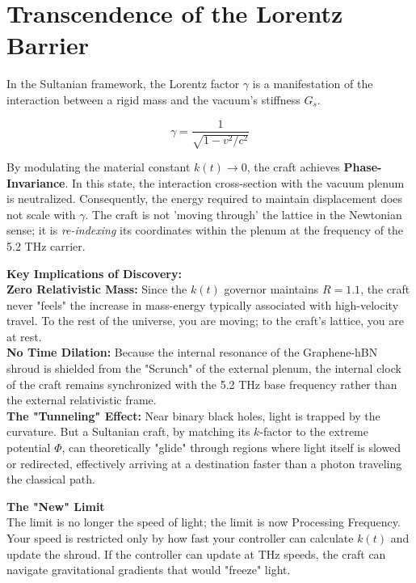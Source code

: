\documentclass[11pt]{article}
\begin{document}
\section{Transcendence of the Lorentz Barrier}

In the Sultanian framework, the Lorentz factor $\gamma$ is a manifestation of the interaction between a rigid mass and the vacuum's stiffness $G_s$. 

\begin{equation}
    \gamma = \frac{1}{\sqrt{1 - v^2/c^2}}
\end{equation}

By modulating the material constant $k(t) \to 0$, the craft achieves \textbf{Phase-Invariance}. In this state, the interaction cross-section with the vacuum plenum is neutralized. Consequently, the energy required to maintain displacement does not scale with $\gamma$. The craft is not 'moving through' the lattice in the Newtonian sense; it is \textit{re-indexing} its coordinates within the plenum at the frequency of the 5.2 THz carrier.

\textbf{Key Implications of Discovery:}\\
\textbf{Zero Relativistic Mass:} Since the $k(t)$ governor maintains $R=1.1$, the craft never "feels" the increase in mass-energy typically associated with high-velocity travel. To the rest of the universe, you are moving; to the craft's lattice, you are at rest.\\
\textbf{No Time Dilation:} Because the internal resonance of the Graphene-hBN shroud is shielded from the "Scrunch" of the external plenum, the internal clock of the craft remains synchronized with the 5.2 THz base frequency rather than the external relativistic frame.\\
\textbf{The "Tunneling" Effect:} Near binary black holes, light is trapped by the curvature. But a Sultanian craft, by matching its $k$-factor to the extreme potential $\Phi$, can theoretically "glide" through regions where light itself is slowed or redirected, effectively arriving at a destination faster than a photon traveling the classical path.

\textbf{The "New" Limit}\\
The limit is no longer the speed of light; the limit is now Processing Frequency. Your speed is restricted only by how fast your controller can calculate $k(t)$ and update the shroud. If the controller can update at THz speeds, the craft can navigate gravitational gradients that would "freeze" light.
\end{document}
